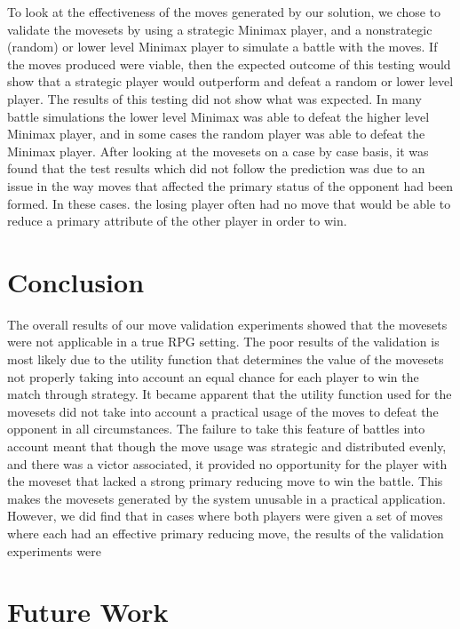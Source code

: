 \documentclass{acm_proc_article-sp}
\begin{document}
To look at the effectiveness of the moves generated by our solution, we chose to validate the movesets by using a strategic Minimax player, and a nonstrategic (random) or lower level Minimax player to simulate a battle with the moves. If the moves produced were viable, then the expected outcome of this testing would show that a strategic player would outperform and defeat a random or lower level player.
The results of this testing did not show what was expected. In many battle simulations the lower level Minimax was able to defeat the higher level Minimax player, and in some cases the random player was able to defeat the Minimax player. After looking at the movesets on a case by case basis, it was found that the test results which did not follow the prediction was due to an issue in the way moves that affected the primary status of the opponent had been formed. In these cases. the losing player often had no move that would be able to reduce a primary attribute of the other player in order to win.
    
    \section{Conclusion}

The overall results of our move validation experiments showed that the movesets were not applicable in a true RPG setting. The poor results of the validation is most likely due to the utility function that determines the value of the movesets not properly taking into account an equal chance for each player to win the match through strategy.  It became apparent that the utility function used for the movesets did not take into account a practical usage of the moves to defeat the opponent in all circumstances. The failure to take this feature of battles into account meant that though the move usage was strategic and distributed evenly, and there was a victor associated, it provided no opportunity for the player with the moveset that lacked a strong primary reducing move to win the battle. This makes the movesets generated by the system unusable in a practical application.
	However, we did find that in cases where both players were given a set of moves where each had an effective primary reducing move, the results of the validation experiments were 

    
    
    \section{Future Work}
\end{document}
